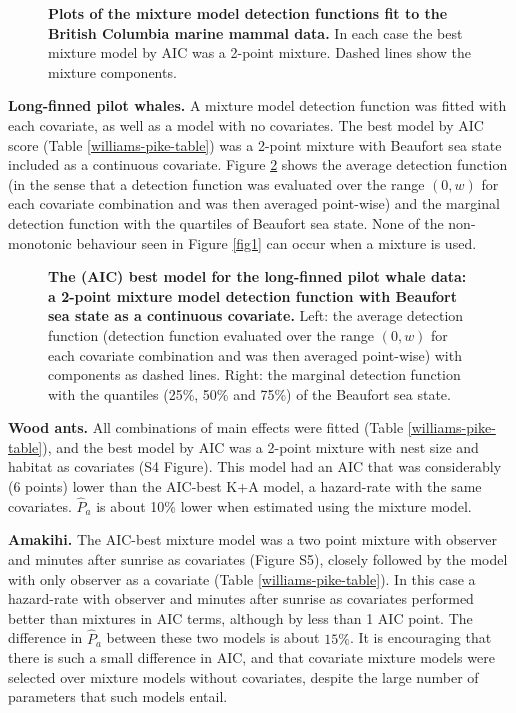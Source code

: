 \documentclass[10pt]{article}
\begin{document}
\begin{figure}[!ht]
\centering
\caption{
{\bf Plots of the mixture model detection functions fit to the British Columbia marine mammal data.} In each case the best mixture model by AIC was a 2-point mixture. Dashed lines show the mixture components.
}
\label{williams-detfcts}
\end{figure}

\textbf{Long-finned pilot whales.} A mixture model detection function was fitted with each covariate, as well as a model with no covariates. The best model by AIC score (Table \ref{williams-pike-table}) was a 2-point mixture with Beaufort sea state included as a continuous covariate. Figure \ref{danpike-detfct} shows the average detection function (in the sense that a detection function was evaluated over the range $(0,w)$ for each covariate combination and was then averaged point-wise) and the marginal detection function with the quartiles of Beaufort sea state. None of the non-monotonic behaviour seen in Figure \ref{fig1} can occur when a mixture is used.

\begin{figure}[!ht]
\centering
\caption{
{\bf The (AIC) best model for the long-finned pilot whale data: a 2-point mixture model detection function with Beaufort sea state as a continuous covariate.} Left: the average detection function (detection function evaluated over the range $(0,w)$ for each covariate combination and was then averaged point-wise) with components as dashed lines. Right: the marginal detection function with the quantiles (25\%, 50\% and 75\%) of the Beaufort sea state.
}
\label{danpike-detfct}
\end{figure}


\textbf{Wood ants.} All combinations of main effects were fitted (Table \ref{williams-pike-table}), and the best model by AIC was a 2-point mixture with nest size and habitat as covariates (S4 Figure). This model had an AIC that was considerably (6 points) lower than the AIC-best K+A model, a hazard-rate with the same covariates.  $\hat{P}_a$ is about 10\% lower when estimated using the mixture model.

\textbf{Amakihi.} The AIC-best mixture model was a two point mixture with observer and minutes after sunrise as covariates (Figure S5), closely followed by the model with only observer as a covariate (Table \ref{williams-pike-table}). In this case a hazard-rate with observer and minutes after sunrise as covariates performed better than mixtures in AIC terms, although by less than 1 AIC point. The difference in $\hat{P}_a$ between these two models is about $15\%$.  It is encouraging that there is such a small difference in AIC, and that covariate mixture models were selected over mixture models without covariates, despite the large number of parameters that such models entail.
\end{document}
